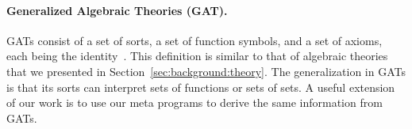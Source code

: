 \paragraph{Generalized Algebraic Theories (GAT).}
GATs consist of a set of sorts, a set of function symbols, and a set of axioms, each being the identity~\cite{cartmell1986gats}. This definition is similar to that of algebraic theories that we presented in Section~\ref{sec:background:theory}. The generalization in GATs is that its sorts can interpret sets of functions or sets of sets. A useful extension of our work is to use our meta programs to derive the same information from GATs. 
